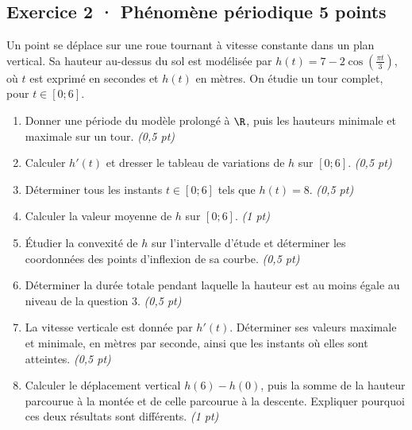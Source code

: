\subsection*{Exercice 2 · Phénomène périodique \hfill 5 points}Un point se déplace sur une roue tournant à vitesse constante dans un plan vertical. Sa hauteur au-dessus du sol est modélisée par $h(t)=7-2\cos\left(\frac{\pi t}{3}\right)$, où $t$ est exprimé en secondes et $h(t)$ en mètres. On étudie un tour complet, pour $t\in[0;6]$.

\begin{enumerate}

\item Donner une période du modèle prolongé à $\R$, puis les hauteurs minimale et maximale sur un tour. \hfill\textit{(0,5 pt)}

\item Calculer $h'(t)$ et dresser le tableau de variations de $h$ sur $[0;6]$. \hfill\textit{(0,5 pt)}

\item Déterminer tous les instants $t\in[0;6]$ tels que $h(t)=8$. \hfill\textit{(0,5 pt)}

\item Calculer la valeur moyenne de $h$ sur $[0;6]$. \hfill\textit{(1 pt)}

\item Étudier la convexité de $h$ sur l'intervalle d'étude et déterminer les coordonnées des points d'inflexion de sa courbe. \hfill\textit{(0,5 pt)}

\item Déterminer la durée totale pendant laquelle la hauteur est au moins égale au niveau de la question 3. \hfill\textit{(0,5 pt)}

\item La vitesse verticale est donnée par $h'(t)$. Déterminer ses valeurs maximale et minimale, en mètres par seconde, ainsi que les instants où elles sont atteintes. \hfill\textit{(0,5 pt)}

\item Calculer le déplacement vertical $h(6)-h(0)$, puis la somme de la hauteur parcourue à la montée et de celle parcourue à la descente. Expliquer pourquoi ces deux résultats sont différents. \hfill\textit{(1 pt)}

\end{enumerate}

\clearpage{}\par


